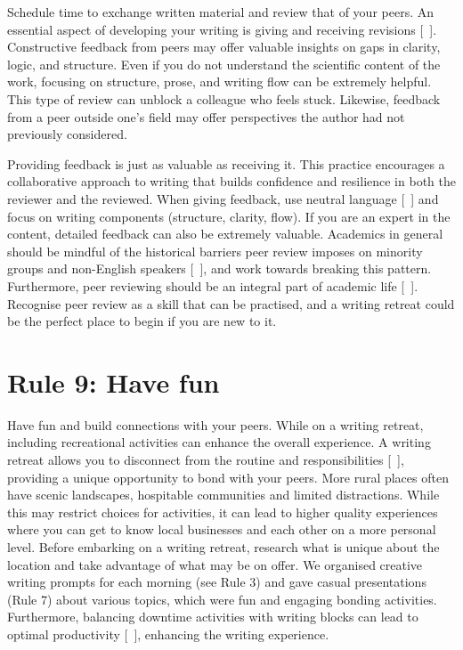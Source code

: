 \documentclass[10pt,letterpaper]{article}
\begin{document}
Schedule time to exchange written material and review that of your peers. An essential aspect of developing your writing is giving and receiving revisions [~\cite{guilford2001, reynolds2011}]. Constructive feedback from peers may offer valuable insights on gaps in clarity, logic, and structure. Even if you do not understand the scientific content of the work, focusing on structure, prose, and writing flow can be extremely helpful. This type of review can unblock a colleague who feels stuck. Likewise, feedback from a peer outside one's field may offer perspectives the author had not previously considered.

Providing feedback is just as valuable as receiving it. This practice encourages a collaborative approach to writing that builds confidence and resilience in both the reviewer and the reviewed. When giving feedback, use neutral language [~\cite{parsons2021}] and focus on writing components (structure, clarity, flow). If you are an expert in the content, detailed feedback can also be extremely valuable. Academics in general should be mindful of the historical barriers peer review imposes on minority groups and non-English speakers [~\cite{smith2023, saleh2024}], and work towards breaking this pattern. Furthermore, peer reviewing should be an integral part of academic life [~\cite{borja2024}]. Recognise peer review as a skill that can be practised, and a writing retreat could be the perfect place to begin if you are new to it.

\section*{Rule 9: Have fun}

Have fun and build connections with your peers. While on a writing retreat, including recreational activities can enhance the overall experience. A writing retreat allows you to disconnect from the routine and responsibilities [~\cite{murray2013}], providing a unique opportunity to bond with your peers. More rural places often have scenic landscapes, hospitable communities and limited distractions. While this may restrict choices for activities, it can lead to higher quality experiences where you can get to know local businesses and each other on a more personal level. Before embarking on a writing retreat, research what is unique about the location and take advantage of what may be on offer. We organised creative writing prompts for each morning (see Rule 3) and gave casual presentations (Rule 7) about various topics, which were fun and engaging bonding activities. Furthermore, balancing downtime activities with writing blocks can lead to optimal productivity [~\cite{eardley2021, lyubykh2022}], enhancing the writing experience.
\end{document}
